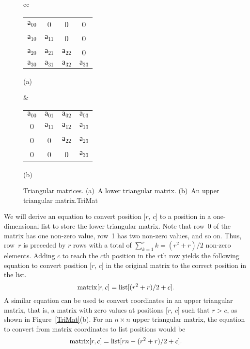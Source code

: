 \begin{figure}
\begin{tabular}{cc}
\begin{minipage}{2.3in}
\begin{centering}
{\sffamily
\begin{tabular}{|cccc|}
\hline
$\mathsf a_{00}$ & 0 & 0 & 0\\
$\mathsf a_{10}$ & $\mathsf a_{11}$ & 0 & 0\\
$\mathsf a_{20}$ & $\mathsf a_{21}$ & $\mathsf a_{22}$ & 0\\
$\mathsf a_{30}$ & $\mathsf a_{31}$ & $\mathsf a_{32}$ & $\mathsf a_{33}$\\
\hline
\end{tabular}
}

\medskip
(a)

\end{centering}
\end{minipage}&

\hfill

\begin{minipage}{2.3in}
\begin{centering}
{\sffamily
\begin{tabular}{|cccc|}
\hline
$\mathsf a_{00}$ & $\mathsf a_{01}$ & $\mathsf a_{02}$ & $\mathsf a_{03}$\\
0 & $\mathsf a_{11}$ & $\mathsf a_{12}$ & $\mathsf a_{13}$\\
0 & 0 & $\mathsf a_{22}$ & $\mathsf a_{23}$\\
0 & 0 & 0 & $\mathsf a_{33}$\\
\hline
\end{tabular}
}

\medskip
(b)

\end{centering}
\end{minipage}
\end{tabular}
\smallskip

{Triangular matrices.
(a)~A lower triangular matrix.
(b)~An upper triangular matrix.}{TriMat}
\smallskip
\end{figure}

We will derive an equation to convert position [$r$, $c$] to a position
in a one-dimensional list to store the lower triangular matrix.
Note that row~0 of the matrix has one non-zero value, row~1 has two
non-zero values, and so on.
Thus, row~$r$ is preceded by $r$ rows with a total of
\(\sum_{k=1}^r k = (r^2 + r)/2\) non-zero elements.
Adding \(c\) to reach the $c$th position in the $r$th row yields the
following equation to convert position [$r$, $c$] in the
original matrix to the correct position in the list.
\[ {\rm matrix}[r, c] = {\rm list}[(r^2 + r)/2 + c]. \]
\noindent A similar equation can be used to convert coordinates in an
upper triangular matrix, that is, a matrix with zero values at
positions
[$r$, $c$] such that $r > c$, as shown in Figure~\ref{TriMat}(b).
For an $n \times n$ upper triangular matrix, the
equation to convert from matrix coordinates to list positions would
be
\[ {\rm matrix}[r, c] = {\rm list}[rn - (r^2 + r)/2 + c]. \]

